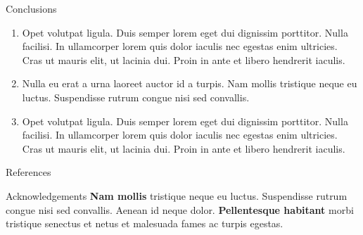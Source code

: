 \documentclass{beamer} %
\begin{document}
\begin{frame}[t]
\begin{columns}[t]
\begin{column}{0.3\textwidth}
			\begin{block}{Conclusions}
				\begin{enumerate}
					\item \alert{Opet volutpat ligula.} Duis semper lorem eget dui dignissim porttitor. Nulla facilisi. In ullamcorper lorem quis dolor iaculis nec egestas enim ultricies. Cras ut mauris elit, ut lacinia dui. Proin in ante et libero hendrerit iaculis.
					\item \alert{Nulla eu erat a urna laoreet auctor id a turpis.} Nam mollis tristique neque eu luctus. Suspendisse rutrum congue nisi sed convallis.
					\item \alert{Opet volutpat ligula.} Duis semper lorem eget dui dignissim porttitor. Nulla facilisi. In ullamcorper lorem quis dolor iaculis nec egestas enim ultricies. Cras ut mauris elit, ut lacinia dui. Proin in ante et libero hendrerit iaculis.
				\end{enumerate}
			\end{block}


			\begin{block}{References}
				\small %
				\vspace{-1ex} %
			\end{block}


			\begin{block}{Acknowledgements}
				\textbf{Nam mollis} tristique neque eu luctus. Suspendisse rutrum congue nisi sed convallis. Aenean id neque dolor. \textbf{Pellentesque habitant} morbi tristique senectus et netus et malesuada fames ac turpis egestas.
			\end{block}




\end{column}
\end{columns}
\end{frame}
\end{document}
